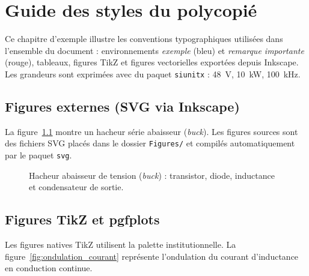 \chapter{Guide des styles du polycopié}
\label{chap:styles}

Ce chapitre d'exemple illustre les conventions typographiques utilisées
dans l'ensemble du document : environnements \textit{exemple} (bleu) et
\textit{remarque importante} (rouge), tableaux, figures TikZ et figures
vectorielles exportées depuis Inkscape. Les grandeurs sont exprimées
avec \SI{}{} du paquet \texttt{siunitx} : \SI{48}{V}, \SI{10}{kW},
\SI{100}{kHz}.

\section{Figures externes (SVG via Inkscape)}

La figure~\ref{fig:convertisseur_buck} montre un hacheur série
abaisseur (\emph{buck}). Les figures sources sont des fichiers SVG
placés dans le dossier \texttt{Figures/} et compilés automatiquement
par le paquet \texttt{svg}.

\begin{figure}[htbp]
    \centering
    
    \caption{Hacheur abaisseur de tension (\emph{buck}) : transistor,
      diode, inductance et condensateur de sortie.}
    \label{fig:convertisseur_buck}
\end{figure}

\section{Figures TikZ et pgfplots}

Les figures natives TikZ utilisent la palette institutionnelle.
La figure~\ref{fig:ondulation_courant} représente l'ondulation du
courant d'inductance en conduction continue.

